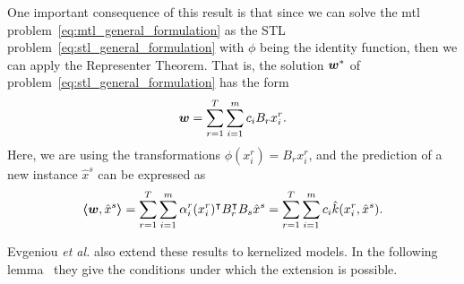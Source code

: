 One important consequence of this result is that since we can solve the \acrshort{mtl} problem~\eqref{eq:mtl_general_formulation} as the STL problem~\eqref{eq:stl_general_formulation} with $\phi$ being the identity function, then we can apply the {Representer Theorem}. That is, the solution ${\bm{w}}^*$ of problem~\eqref{eq:stl_general_formulation} has the form
\begin{equation}
    \nonumber
    \bm{w} = \sum_{r=1}^T \sum_{i=1}^m c_i B_r x_i^r .
\end{equation}
Here, we are using the transformations $\phi(x_i^r) = B_r x_i^r$, and the prediction of a new instance $\hat{x}^s$ can be expressed as
\begin{equation}
    \nonumber
    \bm{\left\langle} \bm{w}, \hat{x}^s \bm{\right\rangle} = \sum_{r=1}^T \sum_{i=1}^m \alpha_i^r  (x_i^r)^\intercal B_r^\intercal B_s \hat{x}^s = \sum_{r=1}^T \sum_{i=1}^m c_i  \hat{k}(x_i^r, \hat{x}^s).
\end{equation}

Evgeniou \emph{et al.} also extend these results to kernelized models. In the following lemma~\cite[Lemma 2]{EvgeniouMP05} they give the conditions under which the extension is possible.

